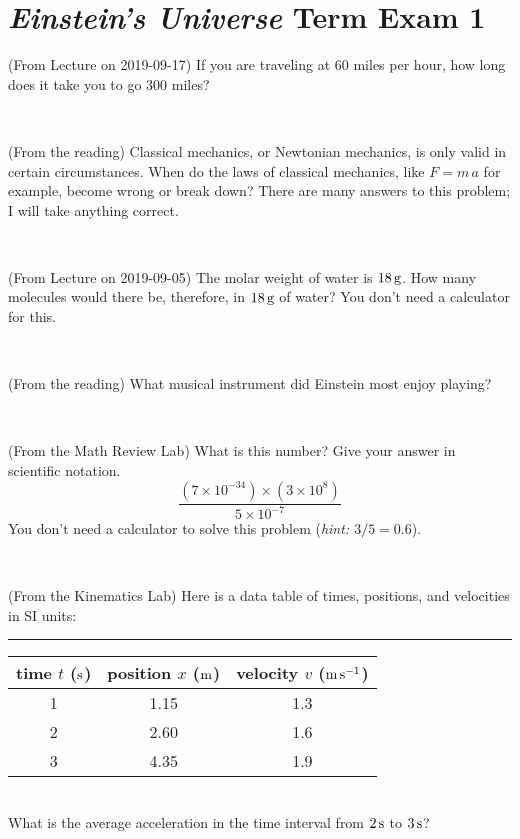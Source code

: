 \documentclass[12pt, letterpaper]{article}
\begin{document}
\section*{\textsl{Einstein's Universe} Term Exam 1}
\setcounter{problem}{1}


\begin{problem} (From Lecture on 2019-09-17)
If you are traveling at 60 miles per hour, how long does
it take you to go 300 miles?
\end{problem}


\vfill ~

\begin{problem} (From the reading)
Classical mechanics, or Newtonian mechanics, is only valid in certain
circumstances. When do the laws of classical mechanics, like $F =
m\,a$ for example, become wrong or break down? There are many answers
to this problem; I will take anything correct.
\end{problem}


\vfill ~

\begin{problem} (From Lecture on 2019-09-05)
The molar weight of water is $18\,\mathrm{g}$. How many molecules would there
be, therefore, in $18\,\mathrm{g}$ of water? You don't need a calculator for
this.
\end{problem}


\vfill ~

\begin{problem} (From the reading)
What musical instrument did Einstein most enjoy playing?
\end{problem}


\vfill ~


\clearpage


\begin{problem} (From the Math Review Lab)
What is this number? Give your answer in scientific notation.
$$
\frac{(7\times10^{-34})\times(3\times10^8)}{5\times10^{-7}}
$$
You don't need a calculator to solve this problem (\textit{hint: $3/5=0.6$}).
\end{problem}


\vfill ~

\begin{problem} (From the Kinematics Lab)
Here is a data table of times, positions, and velocities in SI units:\\
\rule{1.0in}{0pt}\begin{tabular}{c|c|c}
time $t$ ($\mathrm{s}$) & position $x$ ($\mathrm{m}$) & velocity $v$ ($\mathrm{m}\,\mathrm{s}^{-1}$) \\
\hline
1 & 1.15 & 1.3 \\
2 & 2.60 & 1.6 \\
3 & 4.35 & 1.9 \\
\hline
\end{tabular}\\
What is the average acceleration in the time interval from $2\,\mathrm{s}$ to $3\,\mathrm{s}$?
\end{problem}
\end{document}

